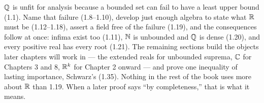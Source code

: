 \begin{recap}
$\mathbb{Q}$ is unfit for analysis because a bounded set can fail to have a least upper
bound (1.1). Name that failure (1.8--1.10), develop just enough algebra to state
what $\mathbb{R}$ must be (1.12--1.18), assert a field free of the failure (1.19), and
the consequences follow at once: infima exist too (1.11), $\mathbb{N}$ is unbounded and
$\mathbb{Q}$ is dense (1.20), and every positive real has every root (1.21). The
remaining sections build the objects later chapters will work in --- the
extended reals for unbounded suprema, $\mathbb{C}$ for Chapters 3 and 8, $\mathbb{R}^k$ for
Chapter 2 onward --- and prove one inequality of lasting importance, Schwarz's
(1.35). Nothing in the rest of the book uses more about $\mathbb{R}$ than 1.19. When a
later proof says ``by completeness,'' that is what it means.
\end{recap}
